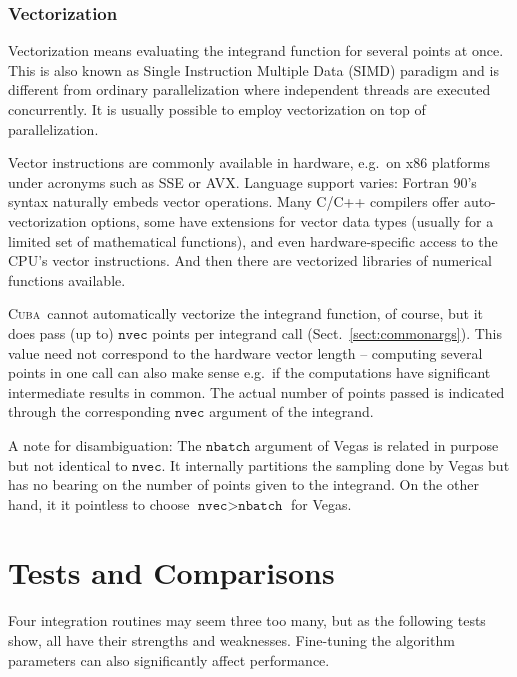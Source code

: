 \documentclass[12pt]{article}
\newcommand\cuba{\textsc{Cuba}}
\newcommand\eg{e.g.\ }
\newcommand\Code[1]{\ensuremath{\texttt{#1}}}
\begin{document}

\subsubsection{Vectorization}

Vectorization means evaluating the integrand function for several points 
at once.  This is also known as Single Instruction Multiple Data (SIMD) 
paradigm and is different from ordinary parallelization where 
independent threads are executed concurrently.  It is usually possible 
to employ vectorization on top of parallelization.

Vector instructions are commonly available in hardware, \eg on x86 
platforms under acronyms such as SSE or AVX.  Language support varies: 
Fortran 90's syntax naturally embeds vector operations.  Many C/C++ 
compilers offer auto-vectorization options, some have extensions for 
vector data types (usually for a limited set of mathematical functions), 
and even hardware-specific access to the CPU's vector instructions.  And 
then there are vectorized libraries of numerical functions available.

\cuba\ cannot automatically vectorize the integrand function, of course, 
but it does pass (up to) \Code{nvec} points per integrand call 
(Sect.~\ref{sect:commonargs}).  This value need not correspond to the 
hardware vector length -- computing several points in one call can also 
make sense \eg if the computations have significant intermediate results 
in common.  The actual number of points passed is indicated through the 
corresponding \Code{nvec} argument of the integrand.

\medskip

A note for disambiguation: The \Code{nbatch} argument of Vegas is 
related in purpose but not identical to \Code{nvec}.  It internally 
partitions the sampling done by Vegas but has no bearing on the number 
of points given to the integrand.  On the other hand, it it pointless to 
choose $\Code{nvec} > \Code{nbatch}$ for Vegas.


\section{Tests and Comparisons}
\label{sect:tests}

Four integration routines may seem three too many, but as the following 
tests show, all have their strengths and weaknesses.  Fine-tuning the 
algorithm parameters can also significantly affect performance.
\end{document}
